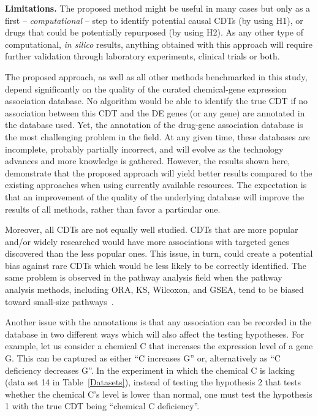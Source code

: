 \textbf{Limitations.}
The proposed method might be useful in many cases but only as a first -- \emph{computational} -- step to identify potential  causal CDTs (by using  H1), or drugs that could be potentially repurposed (by using H2). As any other type of computational, \textit{in silico} results, anything obtained with this approach will require further validation through laboratory experiments, clinical trials or both.

The proposed approach, as well as all other methods benchmarked in this study, depend significantly on the quality of the curated chemical-gene expression association database.
No algorithm would be able to identify the true CDT if no association between this CDT and the DE genes (or any gene) are annotated in the database used.
Yet, the annotation of the drug-gene association database is the most challenging problem in the field. 
At any given time, these databases are incomplete, probably partially incorrect, and will evolve as the technology advances and more knowledge is gathered. However, the results shown here, demonstrate that the proposed approach will yield better results compared to the existing approaches when using currently available resources. The expectation is that an improvement of the quality of the underlying database will improve the results of all methods, rather than favor a particular one. 

Moreover, all CDTs are not equally well studied. CDTs that are more popular and/or widely researched would have more associations with targeted genes discovered than the less popular ones.
This issue, in turn, could create a potential bias against rare CDTs which would be less likely to be correctly identified.
The same problem is observed in the pathway analysis field when the pathway analysis methods, including ORA, KS, Wilcoxon, and GSEA, tend to be biased toward small-size pathways~\cite{nguyen2019identifying}.

Another issue with the annotations is that any association can be recorded in the database in two different ways which will also affect the testing hypotheses.
For example, let us consider a chemical C that increases  the   expression level of a gene G. This can be captured as either ``C increases G'' or, alternatively as ``C deficiency decreases G''. 
In the experiment in which the chemical C is lacking (data set 14 in Table~\ref{Datasets}), instead of testing the hypothesis 2 that tests whether the chemical C's level is lower than normal, one must test the hypothesis 1 with the true CDT being ``chemical C deficiency''.

